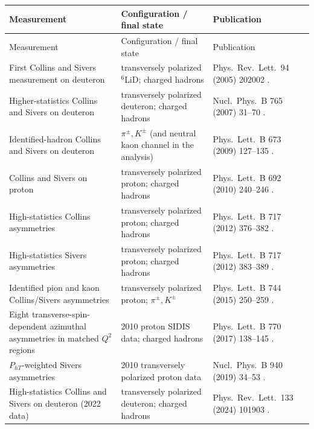 \documentclass[11pt]{article}
\newcommand{\pt}{P_{hT}}
\newcommand{\Qsq}{Q^2}
\begin{document}
\small
\begin{longtable}{@{}p{}p{}p{}@{}}
\toprule
Measurement & Configuration / final state & Publication \\ \midrule
\endfirsthead
\toprule
Measurement & Configuration / final state & Publication \\ \midrule
\endhead
First Collins and Sivers measurement on deuteron &
transversely polarized $^6$LiD; charged hadrons &
Phys.\ Rev.\ Lett.\ 94 (2005) 202002 \cite{COMPASS:CSdeut2005}. \\

Higher-statistics Collins and Sivers on deuteron &
transversely polarized deuteron; charged hadrons &
Nucl.\ Phys.\ B 765 (2007) 31--70 \cite{COMPASS:CSdeut2007}. \\

Identified-hadron Collins and Sivers on deuteron &
$\pi^\pm,K^\pm$ (and neutral kaon channel in the analysis) &
Phys.\ Lett.\ B 673 (2009) 127--135 \cite{COMPASS:CSidentifiedD2009}. \\

Collins and Sivers on proton &
transversely polarized proton; charged hadrons &
Phys.\ Lett.\ B 692 (2010) 240--246 \cite{COMPASS:CSproton2010}. \\

High-statistics Collins asymmetries &
transversely polarized proton; charged hadrons &
Phys.\ Lett.\ B 717 (2012) 376--382 \cite{COMPASS:Collins2012}. \\

High-statistics Sivers asymmetries &
transversely polarized proton; charged hadrons &
Phys.\ Lett.\ B 717 (2012) 383--389 \cite{COMPASS:Sivers2012}. \\

Identified pion and kaon Collins/Sivers asymmetries &
transversely polarized proton; $\pi^\pm,K^\pm$ &
Phys.\ Lett.\ B 744 (2015) 250--259 \cite{COMPASS:identifiedP2015}. \\

Eight transverse-spin-dependent azimuthal asymmetries in matched $\Qsq$ regions &
2010 proton SIDIS data; charged hadrons &
Phys.\ Lett.\ B 770 (2017) 138--145 \cite{COMPASS:eightTSA2017}. \\

$\pt$-weighted Sivers asymmetries &
2010 transversely polarized proton data &
Nucl.\ Phys.\ B 940 (2019) 34--53 \cite{COMPASS:weightedSivers2019}. \\

High-statistics Collins and Sivers on deuteron (2022 data) &
transversely polarized deuteron; charged hadrons &
Phys.\ Rev.\ Lett.\ 133 (2024) 101903 \cite{COMPASS:CSdeut2024}. \\
\bottomrule
\end{longtable}
\normalsize
\end{document}
